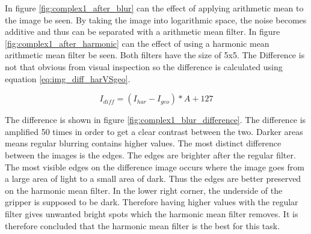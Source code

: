 In figure \ref{fig:complex1_after_blur} can the effect of applying arithmetic mean to the image be seen.
By taking the image into logarithmic space, the noise becomes additive and thus can be separated with a arithmetic mean filter.
In figure \ref{fig:complex1_after_harmonic} can the effect of using a harmonic mean arithmetic mean filter be seen.
Both filters have the size of 5x5. The Difference is not that obvious from visual inspection so the difference is calculated using equation \ref{eq:img_diff_harVSgeo}.

\begin{equation}
I_{diff} = \left( I_{har} - I_{geo} \right) * A + 127
\label{eq:img_diff_harVSgeo}
\end{equation}

The difference is shown in figure \ref{fig:complex1_blur_difference}.
The difference is amplified 50 times in order to get a clear contrast between the two.
Darker areas means regular blurring contains higher values.
The most distinct difference between the images is the edges. 
The edges are brighter after the regular filter. 
The most visible edges on the difference image occurs where the image goes from a large area of light to a small area of dark.
Thus the edges are better preserved on the harmonic mean filter.
In the lower right corner, the underside of the gripper is supposed to be dark.
Therefore having higher values with the regular filter gives unwanted bright spots which the harmonic mean filter removes.
It is therefore concluded that the harmonic mean filter is the best for this task.



